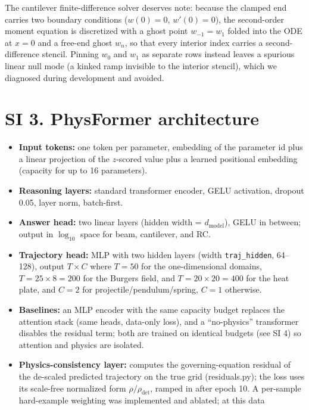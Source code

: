 \documentclass[11pt,a4paper]{article}
\begin{document}
The cantilever finite-difference solver deserves note: because the clamped
end carries two boundary conditions ($w(0)=0$, $w'(0)=0$), the second-order
moment equation is discretized with a ghost point $w_{-1}=w_1$ folded into
the ODE at $x=0$ and a free-end ghost $w_n$, so that every interior index
carries a second-difference stencil. Pinning $w_0$ and $w_1$ as separate
rows instead leaves a spurious linear null mode (a kinked ramp invisible to
the interior stencil), which we diagnosed during development and avoided.

\section*{SI 3. PhysFormer architecture}

\begin{itemize}[leftmargin=1.6em,itemsep=1pt]
\item \textbf{Input tokens:} one token per parameter, embedding of the
      parameter id plus a linear projection of the $z$-scored value plus a
      learned positional embedding (capacity for up to 16 parameters).
\item \textbf{Reasoning layers:} standard transformer encoder, GELU
      activation, dropout 0.05, layer norm, batch-first.
\item \textbf{Answer head:} two linear layers (hidden width = $d_{\text{model}}$),
      GELU in between; output in $\log_{10}$ space for beam, cantilever, and RC.
\item \textbf{Trajectory head:} MLP with two hidden layers (width
      \texttt{traj\_hidden}, 64--128), output $T\times C$ where $T=50$ for the
      one-dimensional domains, $T=25\times8=200$ for the Burgers field, and
      $T=20\times20=400$ for the heat plate, and
      $C=2$ for projectile/pendulum/spring, $C=1$ otherwise.
\item \textbf{Baselines:} an MLP encoder with the same capacity budget
      replaces the attention stack (same heads, data-only loss), and a
      ``no-physics'' transformer disables the residual term; both are trained
      on identical budgets (see SI 4) so attention and physics are isolated.
\item \textbf{Physics-consistency layer:} computes the governing-equation
      residual of the de-scaled predicted trajectory on the true grid
      (residuals.py); the loss uses its scale-free normalized form
      $\rho/\rho_{\text{det}}$, ramped in after epoch 10. A per-sample
      hard-example weighting was implemented and ablated; at this data

\end{itemize}
\end{document}
